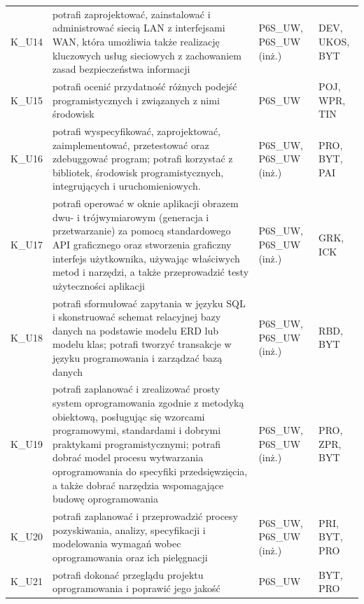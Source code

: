 \documentclass[12pt,a4paper]{article}
\begin{document}
{\begin{longtable}{m{1cm}m{8.8cm}m{2.1cm}m{2.5cm}}
\rowcolor{tableRowAlt} K\_U14 & potrafi zaprojektować, zainstalować i administrować siecią LAN z interfejsami WAN, która umożliwia także realizację kluczowych usług sieciowych z zachowaniem zasad bezpieczeństwa informacji & {\scriptsize P6S\_UW, P6S\_UW {\scriptsize (inż.)}} & {\scriptsize DEV, UKOS, BYT} \\
\rowcolor{tableRowLight} K\_U15 & potrafi ocenić przydatność różnych podejść programistycznych i związanych z nimi środowisk & {\scriptsize P6S\_UW} & {\scriptsize POJ, WPR, TIN} \\
\rowcolor{tableRowAlt} K\_U16 & potrafi wyspecyfikować, zaprojektować, zaimplementować, przetestować oraz zdebuggować program; potrafi korzystać z bibliotek, środowisk programistycznych, integrujących i uruchomieniowych. & {\scriptsize P6S\_UW, P6S\_UW {\scriptsize (inż.)}} & {\scriptsize PRO, BYT, PAI} \\
\rowcolor{tableRowLight} K\_U17 & potrafi operować w oknie aplikacji obrazem dwu- i trójwymiarowym (generacja i przetwarzanie) za pomocą standardowego API graficznego oraz stworzenia graficzny interfejs użytkownika, używając właściwych metod i narzędzi, a także przeprowadzić testy użyteczności aplikacji & {\scriptsize P6S\_UW, P6S\_UW {\scriptsize (inż.)}} & {\scriptsize GRK, ICK} \\
\rowcolor{tableRowAlt} K\_U18 & potrafi sformułować zapytania w języku SQL i skonstruować schemat relacyjnej bazy danych na podstawie modelu ERD lub modelu klas; potrafi tworzyć transakcje w języku programowania i zarządzać bazą danych & {\scriptsize P6S\_UW, P6S\_UW {\scriptsize (inż.)}} & {\scriptsize RBD, BYT} \\
\rowcolor{tableRowLight} K\_U19 & potrafi zaplanować i zrealizować prosty system oprogramowania zgodnie z metodyką obiektową, posługując się wzorcami programowymi, standardami i dobrymi praktykami programistycznymi; potrafi dobrać model procesu wytwarzania oprogramowania do specyfiki przedsięwzięcia, a także dobrać narzędzia wspomagające budowę oprogramowania & {\scriptsize P6S\_UW, P6S\_UW {\scriptsize (inż.)}} & {\scriptsize PRO, ZPR, BYT} \\
\rowcolor{tableRowAlt} K\_U20 & potrafi zaplanować i przeprowadzić procesy pozyskiwania, analizy, specyfikacji i modelowania wymagań wobec oprogramowania oraz ich pielęgnacji & {\scriptsize P6S\_UW, P6S\_UW {\scriptsize (inż.)}} & {\scriptsize PRI, BYT, PRO} \\
\rowcolor{tableRowLight} K\_U21 & potrafi dokonać przeglądu projektu oprogramowania i poprawić jego jakość & {\scriptsize P6S\_UW} & {\scriptsize BYT, PRO} \\

\end{longtable}}
\end{document}
